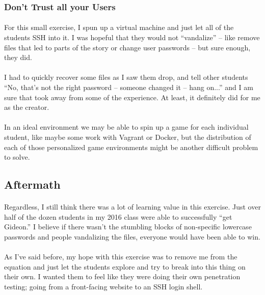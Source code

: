 \documentclass[11pt]{article}
\begin{document}
	\subsubsection{Don't Trust all your Users}

	\paragraph{} For this small exercise, I spun up a virtual machine and just let all of the students SSH into it. I was hopeful that they would not ``vandalize'' -- like remove files that led to parts of the story or change user passwords -- but sure enough, they did.

	\paragraph{} I had to quickly recover some files as I saw them drop, and tell other students ``No, that's not the right password -- someone changed it -- hang on...'' and I am sure that took away from some of the experience. At least, it definitely did for me as the creator.

	\paragraph{} In an ideal environment we may be able to spin up a game for each individual student, like maybe some work with Vagrant or Docker, but the distribution of each of those personalized game environments might be another difficult problem to solve. 

	\subsection{Aftermath}

	\paragraph{} Regardless, I still think there was a lot of learning value in this exercise. Just over half of the dozen students in my 2016 class were able to successfully ``get Gideon.'' I believe if there wasn't the stumbling blocks of non-specific lowercase passwords and people vandalizing the files, everyone would have been able to win.

	\paragraph{} As I've said before, my hope with this exercise was to remove me from the equation and just let the students explore and try to break into this thing on their own. I wanted them to feel like they were doing their own penetration testing; going from a front-facing website to an SSH login shell. 
\end{document}
